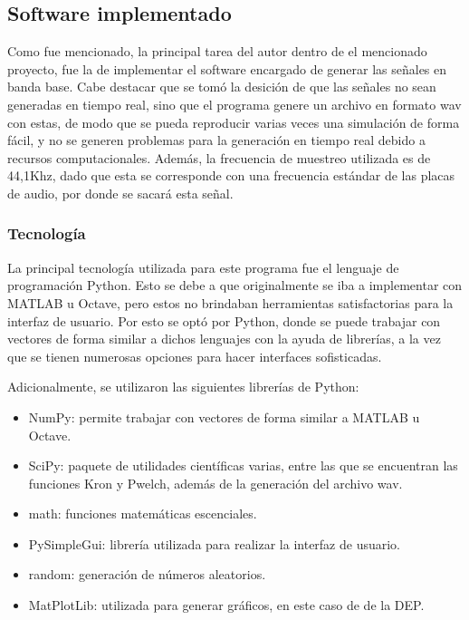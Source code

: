 \documentclass[a4paper,10pt]{article}
\begin{document}
\subsection{Software implementado}
Como fue mencionado, la principal tarea del autor dentro de el mencionado proyecto, fue la de implementar el software encargado de generar las señales en banda base. Cabe destacar que se tomó la desición de que las señales no sean generadas en tiempo real, sino
que el programa genere un archivo en formato wav con estas, de modo que se pueda reproducir varias veces una simulación de forma fácil, y no se generen problemas para la generación en tiempo real debido a recursos computacionales. Además, la frecuencia de muestreo
utilizada es de 44,1Khz, dado que esta se corresponde con una frecuencia estándar de las placas de audio, por donde se sacará esta señal.

\subsubsection{Tecnología}
La principal tecnología utilizada para este programa fue el lenguaje de programación Python. Esto se debe a que originalmente se iba a implementar con MATLAB u Octave, pero estos no brindaban herramientas satisfactorias para la interfaz de usuario. Por esto se optó por
Python, donde se puede trabajar con vectores de forma similar a dichos lenguajes con la ayuda de librerías, a la vez que se tienen numerosas opciones para hacer interfaces sofisticadas.
\par
Adicionalmente, se utilizaron las siguientes librerías de Python:
\begin{itemize}
\item NumPy: permite trabajar con vectores de forma similar a MATLAB u Octave.
\item SciPy: paquete de utilidades científicas varias, entre las que se encuentran las funciones Kron y Pwelch, además de la generación del archivo wav.
\item math: funciones matemáticas escenciales.
\item PySimpleGui: librería utilizada para realizar la interfaz de usuario.
\item random: generación de números aleatorios.
\item MatPlotLib: utilizada para generar gráficos, en este caso de de la DEP.
\end{itemize}
\end{document}
